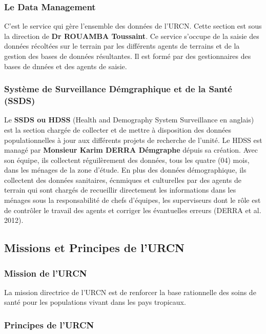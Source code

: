 \documentclass[12pt,a4paper]{report}
\begin{document}
				\subsubsection{Le Data Management}
				
				C'est le service qui gère l'ensemble des données de l'URCN. Cette section est sous la direction de \textbf{Dr ROUAMBA Toussaint}. Ce service s'occupe de la saisie des données récoltées sur le terrain par les différents agents de terrains et de la gestion des bases de données résultantes. Il est formé par des gestionnaires des bases de dnnées et des agents de saisie.
				
				\subsubsection{Système de Surveillance Démgraphique et de la Santé (SSDS)}
				
				Le \textbf{SSDS ou HDSS} (Health and Demography System Surveillance en anglais) est la section chargée de collecter et de mettre à disposition des données populationnelles à jour aux différents projets de recherche de l'unité. Le HDSS est managé par \textbf{Monsieur Karim DERRA Démgraphe} dépuis sa création. Avec son équipe, ils collectent réguilèrement des données, tous les quatre (04) mois, dans les ménages de la zone d'étude. En plus des données démographique, ils collectent des données sanitaires, écnmiques et culturelles par des agents de terrain qui sont chargés de recueillir directement les informations dans les ménages sous la responsabilité de chefs d'équipes, les superviseurs dont le rôle est de contrôler le travail des agents et corriger les  évantuelles erreurs (DERRA et al. 2012).
				
			\subsection{Missions et Principes de l'URCN}
				\subsubsection{Mission de l'URCN}
				
				La mission directrice de l'URCN est de renforcer la base rationnelle des soins de santé pour les populations vivant dans les pays tropicaux.
				
				\subsubsection{Principes de l'URCN}
				
				
				
			
		\newpage
		\tableofcontents              %
\end{document}
